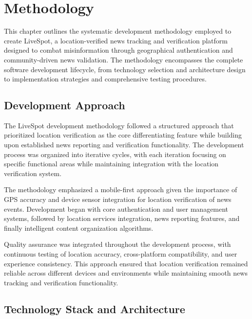 \chapter{Methodology}
\label{ch:method} %

This chapter outlines the systematic development methodology employed to create LiveSpot, a location-verified news tracking and verification platform designed to combat misinformation through geographical authentication and community-driven news validation. The methodology encompasses the complete software development lifecycle, from technology selection and architecture design to implementation strategies and comprehensive testing procedures.

\section{Development Approach}
\label{sec:development-approach}

The LiveSpot development methodology followed a structured approach that prioritized location verification as the core differentiating feature while building upon established news reporting and verification functionality. The development process was organized into iterative cycles, with each iteration focusing on specific functional areas while maintaining integration with the location verification system.

The methodology emphasized a mobile-first approach given the importance of GPS accuracy and device sensor integration for location verification of news events. Development began with core authentication and user management systems, followed by location services integration, news reporting features, and finally intelligent content organization algorithms.

Quality assurance was integrated throughout the development process, with continuous testing of location accuracy, cross-platform compatibility, and user experience consistency. This approach ensured that location verification remained reliable across different devices and environments while maintaining smooth news tracking and verification functionality.

\section{Technology Stack and Architecture}
\label{sec:technology-stack}

